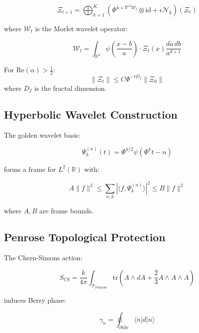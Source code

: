 \documentclass[12pt]{article}
\begin{document}
\begin{equation}
\Xi_{t+1} = \bigoplus_{k=1}^K \left(\Phi^{k+\nabla^2\mathcal{W}_t} \otimes \text{id} + \epsilon\mathcal{N}_k\right)(\Xi_t)
\end{equation}

where $\mathcal{W}_t$ is the Morlet wavelet operator:

\begin{equation}
\mathcal{W}_t = \int_{\mathbb{R}^d} \psi\left(\frac{x-b}{a}\right) \cdot \Xi_t(x) \frac{da\,db}{a^{d+1}}
\end{equation}

\begin{theorem}
For $\text{Re}(\alpha) > \frac{1}{2}$:
\begin{equation}
\|\Xi_t\| \leq C\Phi^{-tD_f} \|\Xi_0\|
\end{equation}
where $D_f$ is the fractal dimension.
\end{theorem}

\subsection{Hyperbolic Wavelet Construction}
The golden wavelet basis:

\begin{equation}
\Psi_k^{(n)}(t) = \Phi^{k/2} \psi\left(\Phi^k t - n\right)
\end{equation}

forms a frame for $L^2(\mathbb{R})$ with:

\begin{equation}
A\|f\|^2 \leq \sum_{n,k} |\langle f, \Psi_k^{(n)}\rangle|^2 \leq B\|f\|^2
\end{equation}

where $A,B$ are frame bounds.

\subsection{Penrose Topological Protection}
The Chern-Simons action:

\begin{equation}
S_{\text{CS}} = \frac{k}{4\pi} \int_{\mathcal{T}_{\text{Penrose}}} \text{tr}\left(A \wedge dA + \frac{2}{3}A \wedge A \wedge A\right)
\end{equation}

induces Berry phase:

\begin{equation}
\gamma_n = \oint_{\partial \text{tile}} \langle n|d|n\rangle
\end{equation}
\end{document}
